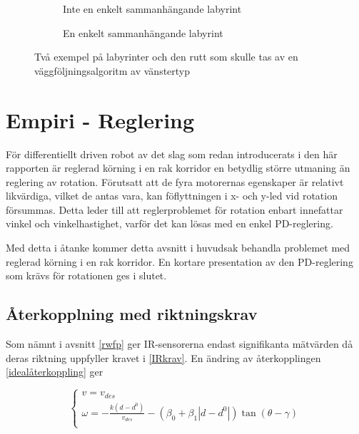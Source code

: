 \documentclass[11pt]{article}
\begin{document}
\begin{flushleft}
\begin{figure}[htbp]
	\centering
	\begin{subfigure}{.5\linewidth}
		\centering
		\noindent\resizebox{.5\textwidth}{!}{
			}
		\caption{Inte en enkelt sammanhängande labyrint}	
		\label{non-connected}
	\end{subfigure}%
	\begin{subfigure}{.5\linewidth}
		\centering
		\noindent\resizebox{.5\textwidth}{!}{
			}
		\caption{En enkelt sammanhängande labyrint}	
	\end{subfigure}%
	\caption{Två exempel på labyrinter och den rutt som skulle tas av en väggföljningsalgoritm av vänstertyp}
	\label{maze}
\end{figure}%



\pagebreak
\section{Empiri - Reglering}
För differentiellt driven robot av det slag som redan introducerats i den här rapporten är reglerad körning i en rak korridor en betydlig större utmaning än reglering av rotation. Förutsatt att de fyra motorernas egenskaper är relativt likvärdiga, vilket de antas vara, kan föflyttningen i x- och y-led vid rotation försummas. Detta leder till att reglerproblemet för rotation enbart innefattar vinkel och vinkelhastighet, varför det kan lösas med en enkel PD-reglering.

Med detta i åtanke kommer detta avsnitt i huvudsak behandla problemet med reglerad körning i en rak korridor. En kortare presentation av den PD-reglering som krävs för rotationen ges i slutet.

\subsection{Återkopplning med riktningskrav}
Som nämnt i avsnitt \ref{rwfp} ger IR-sensorerna endast signifikanta mätvärden då deras riktning uppfyller kravet i \eqref{IRkrav}. En ändring av återkopplingen \eqref{idealåterkoppling} ger

\begin{equation}\label{IRåterkoppling}
	\begin{cases}
	v = v_{des} \\
	\omega = - \frac{k(d-d^0)} {v_{des}} - (\beta_0 + \beta_1 |d - d^0|) \tan(\theta - \gamma) \\
	\end{cases}
\end{equation}


\end{flushleft}
\end{document}
